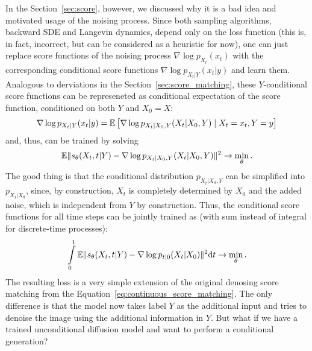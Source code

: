 In the Section~\ref{sec:score}, however, we discussed why it is a bad idea and motivated usage of the noising process. Since both sampling algorithms, backward SDE and Langevin dynamics, depend only on the loss function (this is, in fact, incorrect, but can be considered as a heuristic for now), one can just replace score functions of the noising process $\nabla \log p_{X_t}(x_t)$ with the corresponding conditional score functions $\nabla \log p_{X_t | Y}(x_t | y)$ and learn them. Analogous to derviations in the Section~\ref{sec:score_matching}, these $Y$-conditional score functions can be represeneted as conditional expectation of the score function, conditioned on both $Y$ and $X_0 = X$:
\[
    \nabla \log p_{X_t | Y}(x_t | y) = \mathbb{E} \left[ \nabla \log p_{X_t | X_0, Y}(X_t | X_0, Y) \mid X_t = x_t, Y = y \right]
\]
and, thus, can be trained by solving
\[
    \mathbb{E} \| s_\theta(X_t, t | Y) - \nabla \log p_{X_t | X_0, Y}(X_t | X_0, Y) \|^2 \rightarrow \min\limits_{\theta}.
\]
The good thing is that the conditional distribution $p_{X_t | X_0, Y}$ can be simplified into $p_{X_t | X_0}$, since, by construction, $X_t$ is completely determined by $X_0$ and the added noise, which is independent from $Y$ by construction. Thus, the conditional score functions for all time steps can be jointly trained as (with sum instead of integral for discrete-time processes):
\[
    \int\limits_{0}^{1} \mathbb{E} \| s_\theta(X_t, t | Y) - \nabla \log p_{t | 0}(X_t | X_0) \|^2 \mathrm{d} t \rightarrow \min \limits_{\theta}.
\]
The resulting loss is a very simple extension of the original denosing score matching from the Equation~\ref{eq:continuous_score_matching}. The only difference is that the model now takes label $Y$ as the additional input and tries to denoise the image using the additional information in $Y$. But what if we have a trained unconditional diffusion model and want to perform a conditional generation?

